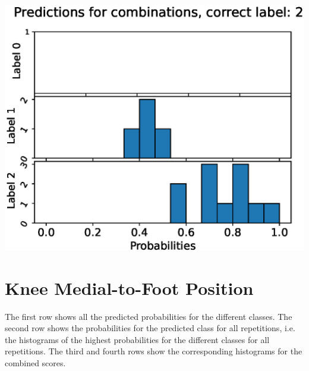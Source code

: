 \begin{center}
\begin{minipage}{0.33\textwidth}
  \includegraphics[width=\textwidth]{files/figs/app/hists/femval/pc2.eps}
\end{minipage}
\end{center}

\newpage
\section{Knee Medial-to-Foot Position}
The first row shows all the predicted probabilities for the different classes. The second row shows the probabilities for the predicted class for all repetitions, i.e. the histograms of the highest probabilities for the different classes for all repetitions. The third and fourth rows show the corresponding histograms for the combined scores.


